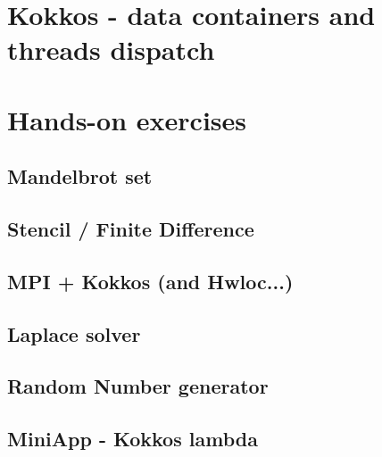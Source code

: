\documentclass[9pt,hyperref={pdfpagemode=FullScreen,urlcolor=blue}]{beamer}
\begin{document}


\section{Kokkos - data containers and threads dispatch}






\section{Hands-on exercises}

\subsection{Mandelbrot set}





\subsection{Stencil / Finite Difference}


\subsection{MPI + Kokkos (and Hwloc...)}


\subsection{Laplace solver}


\subsection{Random Number generator}


\subsection{MiniApp - Kokkos lambda}

\end{document}
